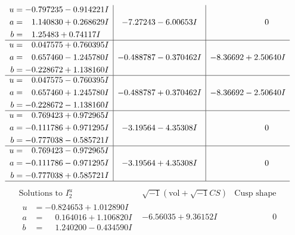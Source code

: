 \documentclass[1p]{elsarticle_modified}
\theoremstyle{definition}
\newcommand{\I}{\sqrt{-1}}
\begin{document}
$$\begin{array}{c|c|c}
\begin{aligned}
u &= -0.797235 - 0.914221 I \\
a &= \phantom{-}1.140830 + 0.268629 I \\
b &= \phantom{-}1.25483 + 0.74117 I\end{aligned}
 & -7.27243 - 6.00653 I & \phantom{-0.000000 } 0 \\ \hline\begin{aligned}
u &= \phantom{-}0.047575 + 0.760395 I \\
a &= \phantom{-}0.657460 - 1.245780 I \\
b &= -0.228672 + 1.138160 I\end{aligned}
 & -0.488787 - 0.370462 I & -8.36692 + 2.50640 I \\ \hline\begin{aligned}
u &= \phantom{-}0.047575 - 0.760395 I \\
a &= \phantom{-}0.657460 + 1.245780 I \\
b &= -0.228672 - 1.138160 I\end{aligned}
 & -0.488787 + 0.370462 I & -8.36692 - 2.50640 I \\ \hline\begin{aligned}
u &= \phantom{-}0.769423 + 0.972965 I \\
a &= -0.111786 + 0.971295 I \\
b &= -0.777038 - 0.585721 I\end{aligned}
 & -3.19564 - 4.35308 I & \phantom{-0.000000 } 0 \\ \hline\begin{aligned}
u &= \phantom{-}0.769423 - 0.972965 I \\
a &= -0.111786 - 0.971295 I \\
b &= -0.777038 + 0.585721 I\end{aligned}
 & -3.19564 + 4.35308 I & \phantom{-0.000000 } 0\\
 \hline 
 \end{array}$$\newpage$$\begin{array}{c|c|c}  
\text{Solutions to }I^u_{2}& \I (\text{vol} + \sqrt{-1}CS) & \text{Cusp shape}\\
 \hline 
\begin{aligned}
u &= -0.824653 + 1.012890 I \\
a &= \phantom{-}0.164016 + 1.106820 I \\
b &= \phantom{-}1.240200 - 0.434590 I\end{aligned}
 & -6.56035 + 9.36152 I & \phantom{-0.000000 } 0 \\ \hline\begin{aligned}

\end{aligned}
\end{array}$$
\end{document}
